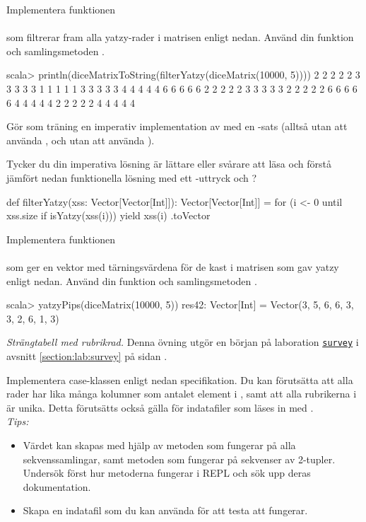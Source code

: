 \Subtask Implementera funktionen \\  \\ som filtrerar fram alla yatzy-rader i matrisen  enligt nedan. Använd din funktion  och samlingsmetoden .
\begin{REPL}
scala> println(diceMatrixToString(filterYatzy(diceMatrix(10000, 5))))
2 2 2 2 2
3 3 3 3 3
1 1 1 1 1
3 3 3 3 3
4 4 4 4 4
6 6 6 6 6
2 2 2 2 2
3 3 3 3 3
2 2 2 2 2
6 6 6 6 6
4 4 4 4 4
2 2 2 2 2
4 4 4 4 4

\end{REPL}



\Subtask Gör som träning en imperativ implementation av  med en -sats (alltså utan att använda , och utan att använda ).


\Subtask\Pen Tycker du din imperativa lösning är lättare eller svårare att läsa och förstå jämfört nedan funktionella lösning med ett -uttryck och ?
\begin{CodeSmall}
def filterYatzy(xss: Vector[Vector[Int]]): Vector[Vector[Int]] = {
  for (i <- 0 until xss.size if isYatzy(xss(i))) yield xss(i)
}.toVector
\end{CodeSmall}

\Subtask Implementera funktionen \\
 \\ som ger en vektor med tärningsvärdena för de kast i matrisen  som gav yatzy enligt nedan. Använd din funktion  och samlingsmetoden .
\begin{REPL}
scala> yatzyPips(diceMatrix(10000, 5))
res42: Vector[Int] = Vector(3, 5, 6, 6, 3, 3, 2, 6, 1, 3)
\end{REPL}




\Task \emph{Strängtabell med rubrikrad.} Denna övning utgör en början på laboration \hyperref[section:lab:survey]{\texttt{survey}} i avsnitt \ref{section:lab:survey} på sidan \pageref{section:lab:survey}.

\Subtask Implementera case-klassen  enligt nedan specifikation. Du kan förutsätta att alla rader har lika många kolumner som antalet element i , samt att alla rubrikerna i  är unika. Detta förutsätts också gälla för indatafiler som läses in med .
\\ \noindent \emph{Tips:}
\begin{itemize}[nolistsep,noitemsep]
\item Värdet  kan skapas med hjälp av metoden  som fungerar på alla sekvenssamlingar, samt metoden  som fungerar på sekvenser av 2-tupler. Undersök först hur metoderna fungerar i REPL och sök upp deras dokumentation.
\item Skapa en indatafil som du kan använda för att testa att  fungerar.
\end{itemize}

